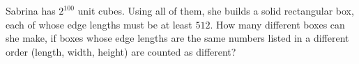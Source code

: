 Sabrina has $2^{100}$ unit cubes. Using all of them, she builds a solid rectangular box, each of whose edge lengths must be at least $512$. How many different boxes can she make, if boxes whose edge lengths are the same numbers listed in a different order (length, width, height) are counted as different?
